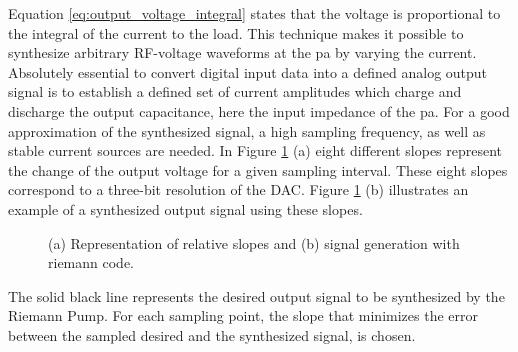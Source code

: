 \documentclass[journal]{IEEEtran}
\begin{document}
%
Equation \ref{eq:output_voltage_integral} states that the voltage is proportional to the integral of the current to the load.
This technique makes it possible to synthesize arbitrary RF-voltage waveforms at the \gls{pa} by varying the current.
Absolutely essential to convert digital input data into a defined analog output signal is to establish a defined set of current amplitudes which charge and discharge the output capacitance, here the input impedance of the \gls{pa}.
For a good approximation of the synthesized signal, a high sampling frequency, as well as stable current sources are needed.
In Figure \ref{fig:SlopeSynthSignal} (a) eight different slopes represent the change of the output voltage for a given sampling interval.
These eight slopes correspond to a three-bit resolution of the DAC. 
Figure \ref{fig:SlopeSynthSignal} (b) illustrates an example of a synthesized output signal using these slopes.
%
\begin{figure}[htb]
  \centering
	\begin{scriptsize}
  	\def\svgwidth{\columnwidth}
 	 
  	\caption{(a) Representation of relative slopes and (b) signal generation with riemann code.}
  	\label{fig:SlopeSynthSignal}
	\end{scriptsize}
\end{figure}
%
The solid black line represents the desired output signal to be synthesized by the Riemann Pump.
For each sampling point, the slope that minimizes the error between the sampled desired and the synthesized signal, is chosen.
\end{document}

